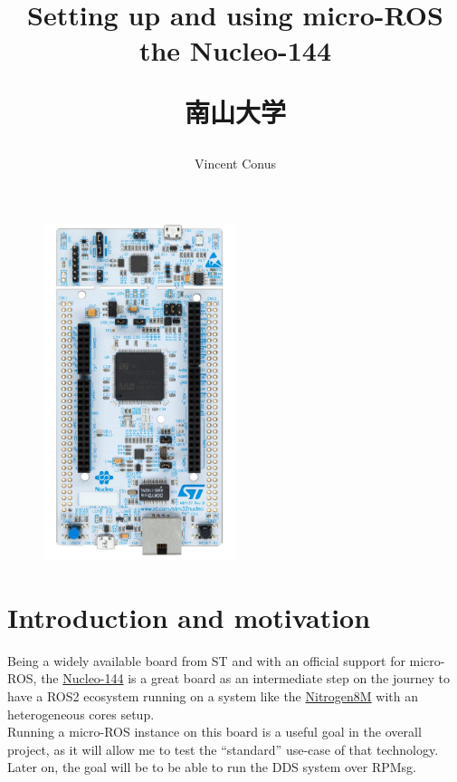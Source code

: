 \documentclass[10pt]{article}
\title{Setting up and using micro-ROS the Nucleo-144 \\[1ex] \large \begin{CJK}{UTF8}{min}南山大学\end{CJK}}
\date{}
\author{Vincent Conus}
\begin{document}
 
\maketitle

\begin{figure}[h]
  \centering
  \includegraphics[width=0.5\textwidth]{./img/board.png}
\end{figure}

\pagebreak
\tableofcontents

\pagebreak
\section{Introduction and motivation}
Being a widely available board from ST and with an official support for micro-ROS, the \href{https://www.st.com/en/evaluation-tools/nucleo-f429zi.html}{Nucleo-144} is a great board as an intermediate step on the journey to have a ROS2 ecosystem running on a system like the \href{https://gitlab.com/nitrogen8m/documentation}{Nitrogen8M} with an heterogeneous cores setup.\\
Running a micro-ROS instance on this board is a useful goal in the overall project, as it will
allow me to test the ``standard'' use-case of that technology.\\
Later on, the goal will be to be able to run the DDS system over RPMsg.\\
\end{document}
